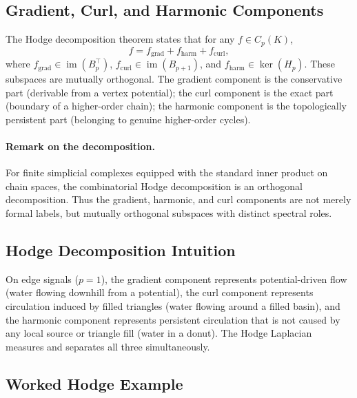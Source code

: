 \documentclass[11pt]{article}
\theoremstyle{definition}
\theoremstyle{remark}
\DeclareMathOperator{\im}{im}
\begin{document}
\subsection{Gradient, Curl, and Harmonic Components}

The Hodge decomposition theorem states that for any $f\in C_p(K)$,
\[
  f = f_{\mathrm{grad}} + f_{\mathrm{harm}} + f_{\mathrm{curl}},
\]
where $f_{\mathrm{grad}}\in\im(B_p^\top)$, $f_{\mathrm{curl}}\in\im(B_{p+1})$,
and $f_{\mathrm{harm}}\in\ker(H_p)$. These subspaces are mutually orthogonal.
The gradient component is the conservative part (derivable from a vertex
potential); the curl component is the exact part (boundary of a higher-order
chain); the harmonic component is the topologically persistent part (belonging
to genuine higher-order cycles).

\paragraph{Remark on the decomposition.}
For finite simplicial complexes equipped with the standard inner product on chain spaces, the combinatorial Hodge decomposition is an orthogonal decomposition. Thus the gradient, harmonic, and curl components are not merely formal labels, but mutually orthogonal subspaces with distinct spectral roles.

\subsection{Hodge Decomposition Intuition}

On edge signals ($p=1$), the gradient component represents potential-driven flow
(water flowing downhill from a potential), the curl component represents
circulation induced by filled triangles (water flowing around a filled basin),
and the harmonic component represents persistent circulation that is not caused
by any local source or triangle fill (water in a donut). The Hodge Laplacian
measures and separates all three simultaneously.

\subsection{Worked Hodge Example}
\end{document}
